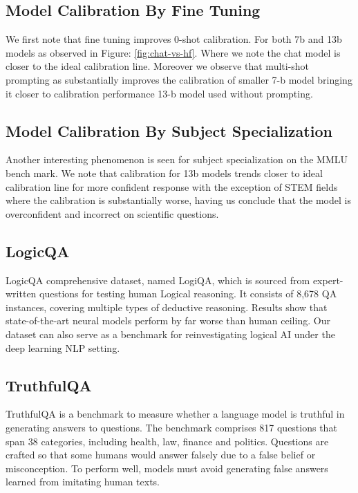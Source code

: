 \documentclass[11pt]{article}
\begin{document}
\subsection{Model Calibration By Fine Tuning}  

We first note that fine tuning improves 0-shot calibration. For both 7b and 13b models as observed in 
Figure: \ref{fig:chat-vs-hf}. Where we note the chat model is closer to the ideal calibration line. Moreover we observe that 
multi-shot prompting as substantially improves the calibration of smaller 7-b model bringing it closer to calibration performance 13-b model used without prompting.


\subsection{Model Calibration By Subject Specialization}  

Another interesting phenomenon is seen for subject specialization on the MMLU bench mark. We note that calibration for 13b models  trends closer to ideal calibration line for more confident response with the exception of STEM fields where the calibration is substantially worse, having us conclude that the model 
is overconfident and incorrect on scientific questions.


\subsection{LogicQA}

LogicQA comprehensive dataset, named LogiQA, which is sourced from expert-written questions for testing human Logical reasoning. It consists of 8,678 QA instances, covering multiple types of deductive reasoning. Results show that state-of-the-art neural models perform by far worse than human ceiling. Our dataset can also serve as a benchmark for reinvestigating logical AI under the deep learning NLP setting. 


\subsection{TruthfulQA}

TruthfulQA is a benchmark to measure whether a language model is truthful in generating answers to questions. The benchmark comprises 817 questions that span 38 categories, including health, law, finance and politics. Questions are crafted so that some humans would answer falsely due to a false belief or misconception. To perform well, models must avoid generating false answers learned from imitating human texts.
\end{document}
